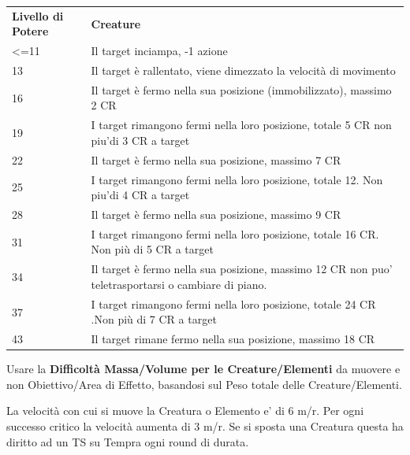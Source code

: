\documentclass[a4paper,10 pt,twoside,openany]{book}
\begin{document}
\bigskip

\begin{tabularx}{0.95\textwidth}{lX}
	\toprule
	\textbf{Livello di Potere} & \textbf{Creature}\\
	\textless=11   & Il target inciampa, -1 azione\\
	13       & Il target è rallentato, viene dimezzato la velocità di movimento\\
	16       & Il target è fermo nella sua posizione (immobilizzato), massimo 2	CR\\
	19       & I target rimangono fermi nella loro posizione, totale 5 CR non piu'di 3 CR a target\\
	22       & Il target è fermo nella sua posizione, massimo 7 CR\\
	25       & I target rimangono fermi nella loro posizione, totale 12. Non piu'di 4 CR a target\\
	28      & Il target è fermo nella sua posizione, massimo 9 CR\\
	31      & I target rimangono fermi nella loro posizione, totale 16 CR. Non più di 5 CR a target\\
	34       & Il target è fermo nella sua posizione, massimo 12 CR non puo' teletrasportarsi o cambiare di piano.\\
	37       & I target rimangono fermi nella loro posizione, totale 24 CR .Non più di 7 CR a target\\
	43      & Il target rimane fermo nella sua posizione, massimo 18 CR\\
\end{tabularx}

\bigskip

Usare la \textbf{Difficoltà Massa/Volume per le Creature/Elementi} da muovere e non Obiettivo/Area di Effetto, basandosi sul Peso totale delle Creature/Elementi.

La velocità con cui si muove la Creatura o Elemento e' di 6 m/r. Per ogni successo critico la velocità aumenta di 3 m/r.
Se si sposta una Creatura questa ha diritto ad un TS su Tempra ogni round di durata.
\bigskip\
\end{document}
